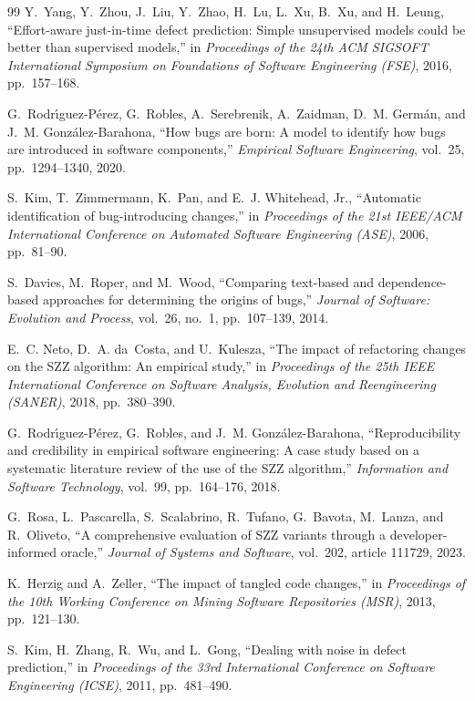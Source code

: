 \documentclass[12pt,a4paper,oneside]{report}
\begin{document}
{\begin{thebibliography}{99}
Y.~Yang, Y.~Zhou, J.~Liu, Y.~Zhao, H.~Lu, L.~Xu, B.~Xu, and H.~Leung,
``Effort-aware just-in-time defect prediction: Simple unsupervised models
could be better than supervised models,'' in \emph{Proceedings of the 24th ACM
SIGSOFT International Symposium on Foundations of Software Engineering (FSE)},
2016, pp.~157--168.

G.~Rodr\'{\i}guez-P\'{e}rez, G.~Robles, A.~Serebrenik, A.~Zaidman, D.~M.
Germ\'{a}n, and J.~M. Gonz\'{a}lez-Barahona, ``How bugs are born: A model to
identify how bugs are introduced in software components,'' \emph{Empirical
Software Engineering}, vol.~25, pp.~1294--1340, 2020.

S.~Kim, T.~Zimmermann, K.~Pan, and E.~J. Whitehead, Jr., ``Automatic
identification of bug-introducing changes,'' in \emph{Proceedings of the 21st
IEEE/ACM International Conference on Automated Software Engineering (ASE)},
2006, pp.~81--90.

S.~Davies, M.~Roper, and M.~Wood, ``Comparing text-based and dependence-based
approaches for determining the origins of bugs,'' \emph{Journal of Software:
Evolution and Process}, vol.~26, no.~1, pp.~107--139, 2014.

E.~C. Neto, D.~A. da~Costa, and U.~Kulesza, ``The impact of refactoring changes
on the SZZ algorithm: An empirical study,'' in \emph{Proceedings of the 25th
IEEE International Conference on Software Analysis, Evolution and
Reengineering (SANER)}, 2018, pp.~380--390.

G.~Rodr\'{\i}guez-P\'{e}rez, G.~Robles, and J.~M. Gonz\'{a}lez-Barahona,
``Reproducibility and credibility in empirical software engineering: A case
study based on a systematic literature review of the use of the SZZ
algorithm,'' \emph{Information and Software Technology}, vol.~99,
pp.~164--176, 2018.

G.~Rosa, L.~Pascarella, S.~Scalabrino, R.~Tufano, G.~Bavota, M.~Lanza, and
R.~Oliveto, ``A comprehensive evaluation of SZZ variants through a
developer-informed oracle,'' \emph{Journal of Systems and Software}, vol.~202,
article 111729, 2023.

K.~Herzig and A.~Zeller, ``The impact of tangled code changes,'' in
\emph{Proceedings of the 10th Working Conference on Mining Software
Repositories (MSR)}, 2013, pp.~121--130.

S.~Kim, H.~Zhang, R.~Wu, and L.~Gong, ``Dealing with noise in defect
prediction,'' in \emph{Proceedings of the 33rd International Conference on
Software Engineering (ICSE)}, 2011, pp.~481--490.


\end{thebibliography}}
\end{document}
